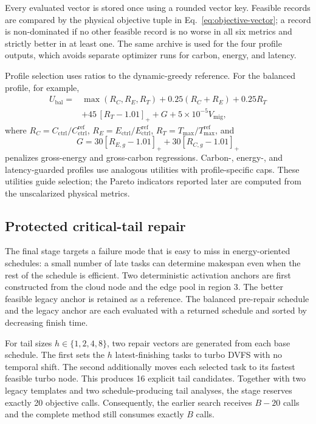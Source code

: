 Every evaluated vector is stored once using a rounded vector key. Feasible records are compared by the physical objective tuple in Eq.~\eqref{eq:objective-vector}; a record is non-dominated if no other feasible record is no worse in all six metrics and strictly better in at least one. The same archive is used for the four profile outputs, which avoids separate optimizer runs for carbon, energy, and latency.

Profile selection uses ratios to the dynamic-greedy reference. For the balanced profile, for example,
\begin{align}
U_{\mathrm{bal}} ={}& \max(R_C,R_E,R_T)+0.25(R_C+R_E)+0.25R_T \\
&+45\,[R_T-1.01]_+ + G + 5\times10^{-5}V_{\mathrm{mig}},
\label{eq:balanced-utility}
\end{align}
where $R_C=C_{\mathrm{ctrl}}/C_{\mathrm{ctrl}}^{\mathrm{ref}}$, $R_E=E_{\mathrm{ctrl}}/E_{\mathrm{ctrl}}^{\mathrm{ref}}$, $R_T=T_{\max}/T_{\max}^{\mathrm{ref}}$, and
\begin{equation}
G=30[R_{E,g}-1.01]_+ +30[R_{C,g}-1.01]_+
\end{equation}
penalizes gross-energy and gross-carbon regressions. Carbon-, energy-, and latency-guarded profiles use analogous utilities with profile-specific caps. These utilities guide selection; the Pareto indicators reported later are computed from the unscalarized physical metrics.

\subsection{Protected critical-tail repair}
\label{sec:tail-repair}

The final stage targets a failure mode that is easy to miss in energy-oriented schedules: a small number of late tasks can determine makespan even when the rest of the schedule is efficient. Two deterministic activation anchors are first constructed from the cloud node and the edge pool in region 3. The better feasible legacy anchor is retained as a reference. The balanced pre-repair schedule and the legacy anchor are each evaluated with a returned schedule and sorted by decreasing finish time.

For tail sizes $h\in\{1,2,4,8\}$, two repair vectors are generated from each base schedule. The first sets the $h$ latest-finishing tasks to turbo DVFS with no temporal shift. The second additionally moves each selected task to its fastest feasible turbo node. This produces 16 explicit tail candidates. Together with two legacy templates and two schedule-producing tail analyses, the stage reserves exactly 20 objective calls. Consequently, the earlier search receives $B-20$ calls and the complete method still consumes exactly $B$ calls.


